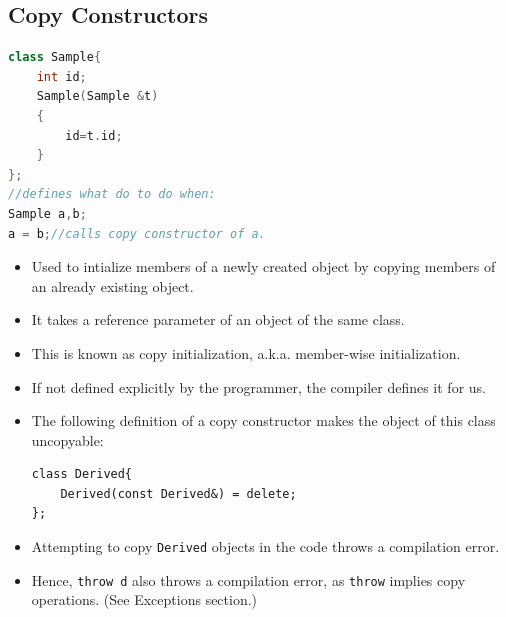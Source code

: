 \documentclass{report}
\begin{document}
\subsection{Copy Constructors}
\begin{lstlisting}[language=C++]
class Sample{
    int id;
    Sample(Sample &t)
    {
        id=t.id;
    }
};
//defines what do to do when:
Sample a,b;
a = b;//calls copy constructor of a.
\end{lstlisting}
\begin{itemize}
\item Used to intialize members of a newly created object by copying members of an already existing object.
\item It takes a reference parameter of an object of the same class.
\item This is known as copy initialization, a.k.a. member-wise initialization.
\item If not defined explicitly by the programmer, the compiler 
defines it for us.
\item The following definition of a copy constructor makes the object of this class uncopyable:
\begin{lstlisting}
class Derived{
    Derived(const Derived&) = delete;
};
\end{lstlisting}
\item Attempting to copy \texttt{Derived} objects in the code throws a compilation error.
\item Hence, \texttt{throw d} also throws a compilation error, as \texttt{throw} implies copy operations. (See Exceptions section.)
\end{itemize}
\end{document}
